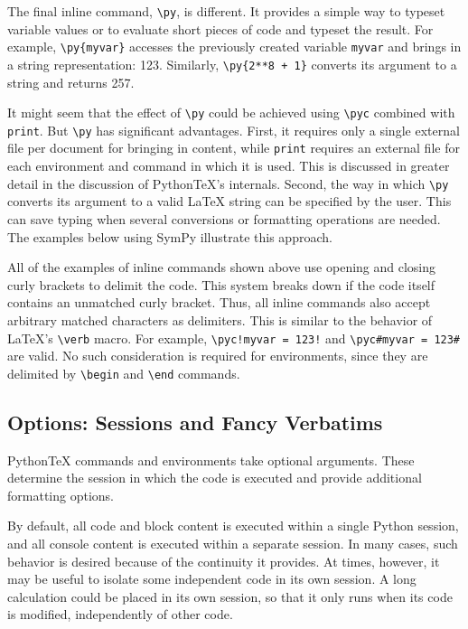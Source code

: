 \documentclass[letterpaper,compsoc,twoside]{IEEEtran}
\begin{document}
The final inline command, \texttt{\textbackslash{}py}, is different.  It provides a simple way
to typeset variable values or to evaluate short pieces of code and typeset
the result.  For example, \texttt{\textbackslash{}py\{myvar\}} accesses the previously created
variable \texttt{myvar} and brings in a string representation:  123.  Similarly, \texttt{\textbackslash{}py\{2**8 + 1\}} converts its argument to a string and returns
257.

It might seem that the effect of \texttt{\textbackslash{}py} could be achieved using \texttt{\textbackslash{}pyc}
combined with \texttt{print}.  But \texttt{\textbackslash{}py} has significant advantages.  First,
it requires only a single external file per document for bringing in content,
while \texttt{print} requires an external file for each environment and command in
which it is used.  This is discussed in greater detail in the discussion of
PythonTeX's internals.  Second, the way in which \texttt{\textbackslash{}py} converts its argument
to a valid LaTeX string can be specified by the user.  This can save typing
when several conversions or formatting operations are needed.  The examples
below using SymPy illustrate this approach.

All of the examples of inline commands shown above use opening and closing
curly brackets to delimit the code.  This system breaks down if the code
itself contains an unmatched curly bracket.  Thus, all inline commands
also accept arbitrary matched characters as delimiters.  This is similar
to the behavior of LaTeX's \texttt{\textbackslash{}verb} macro.  For example,
\texttt{\textbackslash{}pyc!myvar = 123!} and \texttt{\textbackslash{}pyc\#myvar = 123\#} are valid.  No such
consideration is required for environments, since they are delimited
by \texttt{\textbackslash{}begin} and \texttt{\textbackslash{}end} commands.

\subsection{Options:  Sessions and Fancy Verbatims%
  \label{options-sessions-and-fancy-verbatims}%
}


PythonTeX commands and environments take optional arguments.  These
determine the session in which the code is executed and provide
additional formatting options.

By default, all code and block content is executed within a single
Python session, and all console content is executed within a separate
session.  In many cases, such behavior is desired because of the continuity
it provides.  At times, however, it may be useful to isolate some independent
code in its own session.  A long calculation could be placed in
its own session, so that it only runs when its code is modified, independently
of other code.
\end{document}

